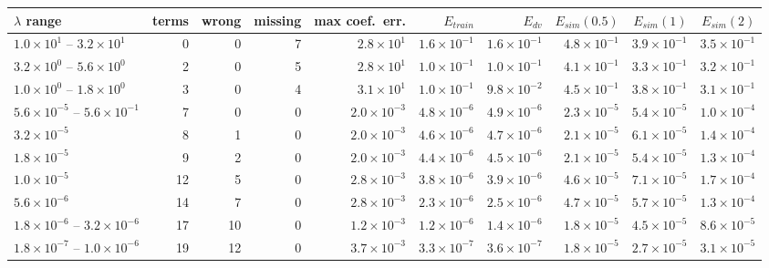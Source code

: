 \begin{tabular}{lrrrrrrrrr}\toprule
$\lambda$ range & terms & wrong & missing & max coef.\ err. & $E_{train}$ & $E_{dv}$ & $E_{sim}(0.5)$ & $E_{sim}(1)$ & $E_{sim}(2)$\\\midrule
$1.0\!\times\!10^{1}$ -- $3.2\!\times\!10^{1}$ & 0 & 0 & 7 & $2.8\!\times\!10^{1}$ & $1.6\!\times\!10^{-1}$ & $1.6\!\times\!10^{-1}$ & $4.8\!\times\!10^{-1}$ & $3.9\!\times\!10^{-1}$ & $3.5\!\times\!10^{-1}$\\
$3.2\!\times\!10^{0}$ -- $5.6\!\times\!10^{0}$ & 2 & 0 & 5 & $2.8\!\times\!10^{1}$ & $1.0\!\times\!10^{-1}$ & $1.0\!\times\!10^{-1}$ & $4.1\!\times\!10^{-1}$ & $3.3\!\times\!10^{-1}$ & $3.2\!\times\!10^{-1}$\\
$1.0\!\times\!10^{0}$ -- $1.8\!\times\!10^{0}$ & 3 & 0 & 4 & $3.1\!\times\!10^{1}$ & $1.0\!\times\!10^{-1}$ & $9.8\!\times\!10^{-2}$ & $4.5\!\times\!10^{-1}$ & $3.8\!\times\!10^{-1}$ & $3.1\!\times\!10^{-1}$\\
\rowcolor{sel}$5.6\!\times\!10^{-5}$ -- $5.6\!\times\!10^{-1}$ & 7 & 0 & 0 & $2.0\!\times\!10^{-3}$ & $4.8\!\times\!10^{-6}$ & $4.9\!\times\!10^{-6}$ & $2.3\!\times\!10^{-5}$ & $5.4\!\times\!10^{-5}$ & $1.0\!\times\!10^{-4}$\\
$3.2\!\times\!10^{-5}$ & 8 & 1 & 0 & $2.0\!\times\!10^{-3}$ & $4.6\!\times\!10^{-6}$ & $4.7\!\times\!10^{-6}$ & $2.1\!\times\!10^{-5}$ & $6.1\!\times\!10^{-5}$ & $1.4\!\times\!10^{-4}$\\
$1.8\!\times\!10^{-5}$ & 9 & 2 & 0 & $2.0\!\times\!10^{-3}$ & $4.4\!\times\!10^{-6}$ & $4.5\!\times\!10^{-6}$ & $2.1\!\times\!10^{-5}$ & $5.4\!\times\!10^{-5}$ & $1.3\!\times\!10^{-4}$\\
$1.0\!\times\!10^{-5}$ & 12 & 5 & 0 & $2.8\!\times\!10^{-3}$ & $3.8\!\times\!10^{-6}$ & $3.9\!\times\!10^{-6}$ & $4.6\!\times\!10^{-5}$ & $7.1\!\times\!10^{-5}$ & $1.7\!\times\!10^{-4}$\\
$5.6\!\times\!10^{-6}$ & 14 & 7 & 0 & $2.8\!\times\!10^{-3}$ & $2.3\!\times\!10^{-6}$ & $2.5\!\times\!10^{-6}$ & $4.7\!\times\!10^{-5}$ & $5.7\!\times\!10^{-5}$ & $1.3\!\times\!10^{-4}$\\
$1.8\!\times\!10^{-6}$ -- $3.2\!\times\!10^{-6}$ & 17 & 10 & 0 & $1.2\!\times\!10^{-3}$ & $1.2\!\times\!10^{-6}$ & $1.4\!\times\!10^{-6}$ & $1.8\!\times\!10^{-5}$ & $4.5\!\times\!10^{-5}$ & $8.6\!\times\!10^{-5}$\\
$1.8\!\times\!10^{-7}$ -- $1.0\!\times\!10^{-6}$ & 19 & 12 & 0 & $3.7\!\times\!10^{-3}$ & $3.3\!\times\!10^{-7}$ & $3.6\!\times\!10^{-7}$ & $1.8\!\times\!10^{-5}$ & $2.7\!\times\!10^{-5}$ & $3.1\!\times\!10^{-5}$\\

\end{tabular}
